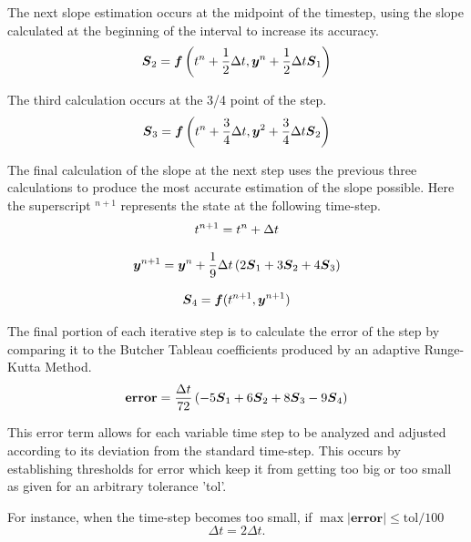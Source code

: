 \documentclass[letterpaper, twoside]{article}
\numberwithin{equation}{section}
\def\bm#1{\mbox{\boldmath{$#1$}}}
\begin{document}
The next slope estimation occurs at the midpoint of the timestep, using the slope calculated at the beginning of the interval to increase its accuracy.
\begin{equation} \label{eq: S_2}
  \mathcal{\bm{S}}_2 = \bm{f}\left(t^n + \frac{1}{2} \Delta t,\bm{y}^n + \frac{1}{2} \Delta t \mathcal{\bm{S}}_1\right)
\end{equation}

The third calculation occurs at the 3/4  point of the step.
\begin{equation} \label{eq: S_3}
  \mathcal{\bm{S}}_3 = \bm{f}\left(t^n + \frac{3}{4} \Delta t,\bm{y}^2+\frac{3}{4} \Delta t \mathcal{\bm{S}}_2\right)
\end{equation}

The final calculation of the slope at the next step uses the previous three calculations to produce the most accurate estimation of the slope possible. Here the superscript $^{n+1}$ represents the state at the following time-step.
\begin{equation} \label{eq: t_{new}}
  t^{n+1} = t^n + \Delta t
\end{equation}

\begin{equation} \label{eq: y_{new}}
  \bm{y}^{n+1} = \bm{y}^n + \frac{1}{9} \Delta t \left(2 \mathcal{\bm{S}}_1 + 3 \mathcal{\bm{S}}_2 + 4 \mathcal{\bm{S}}_3\right)
\end{equation}

\begin{equation} \label{eq: S_4}
  \bm{S}_4 = \bm{f}(t^{n+1},\bm{y}^{n+1})
\end{equation}

The final portion of each iterative step is to calculate the error of the step by comparing it to the Butcher Tableau coefficients produced by an adaptive Runge-Kutta Method.
\begin{equation} \label{eq: errorfunction}
  \mathrm{\textbf{error}} = \frac{\Delta t}{72} \left(-5 \bm{S}_1 + 6 \bm{S}_2 + 8 \bm{S}_3 - 9 \bm{S}_4\right)
\end{equation}

This error term allows for each variable time step to be analyzed and adjusted according to its deviation from the standard time-step. This occurs by establishing thresholds for error which keep it from getting too big or too small as given for an arbitrary tolerance 'tol'.

For instance, when the time-step becomes too small, if $\max\left|\mathrm{\textbf{error}}\right| \leq \mathrm{tol}/100$
\begin{equation}
  \Delta t = 2 \Delta t.
\end{equation}
\end{document}
